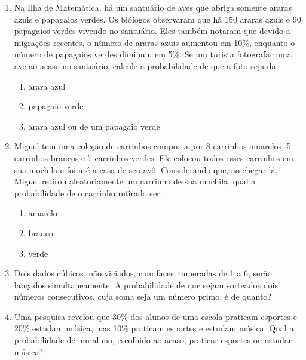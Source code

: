 \documentclass[a4paper]{article}
\begin{document}
	\begin{enumerate}
		\item Na Ilha de Matemática, há um santuário de aves que abriga somente araras azuis e papagaios verdes. Os biólogos observaram que há 150 araras azuis e 90 papagaios verdes vivendo no santuário. Eles também notaram que devido a migrações recentes, o número de araras azuis aumentou em 10\%, enquanto o número de papagaios verdes diminuiu em 5\%. Se um turista fotografar uma ave ao acaso no santuário, calcule a probabilidade de que a foto seja da:  \vspace*{-5mm}
		
		\begin{multicols}{3}[\setlength{\columnsep}{-1cm}]	
			\begin{enumerate}[]
				\item arara azul
				\item papagaio verde
				\item arara azul ou de um papagaio verde				
			\end{enumerate}
		\end{multicols}  \vspace*{-5mm}
		
		
		\item Miguel tem uma coleção de carrinhos composta por 8 carrinhos amarelos, 5 carrinhos brancos e 7 carrinhos verdes. Ele colocou todos esses carrinhos em sua mochila e foi até a casa de seu avô. Considerando que, ao chegar lá, Miguel retirou aleatoriamente um carrinho de sua mochila, qual a probabilidade de o carrinho retirado ser:  \vspace*{-5mm}
		
		\begin{multicols}{3}[\setlength{\columnsep}{-1cm}]	
			\begin{enumerate}[]
				\item amarelo
				\item branco
				\item verde				
			\end{enumerate}
		\end{multicols}  \vspace*{-5mm}
		
		\item
		Dois dados cúbicos, não viciados, com faces numeradas de 1 a 6, serão lançados simultaneamente. A probabilidade de que sejam sorteados dois números consecutivos, cuja soma seja um número primo, é de quanto?
		
		\item  Uma pesquisa revelou que 30\% dos alunos de uma escola praticam esportes e 20\% estudam música, mas 10\% praticam esportes e estudam música. Qual a probabilidade de um aluno, escolhido ao acaso, praticar esportes ou estudar música?
		

\end{enumerate}
\end{document}
